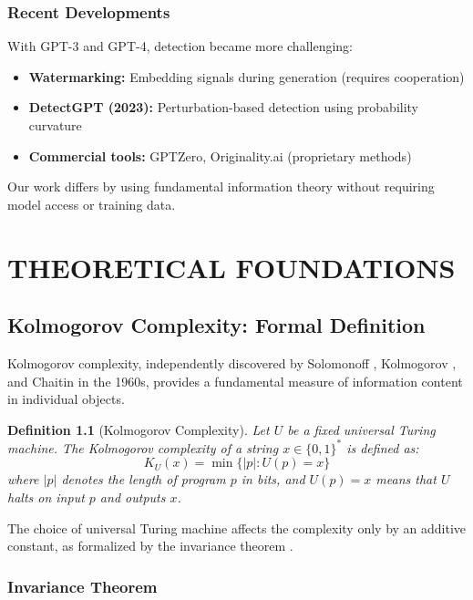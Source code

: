 \documentclass[12pt,a4paper]{report}
\newtheorem{definition}[theorem]{Definition}
\begin{document}
\subsection{Recent Developments}

With GPT-3 and GPT-4, detection became more challenging:

\begin{itemize}
    \item \textbf{Watermarking:} Embedding signals during generation (requires cooperation)
    \item \textbf{DetectGPT (2023):} Perturbation-based detection using probability curvature
    \item \textbf{Commercial tools:} GPTZero, Originality.ai (proprietary methods)
\end{itemize}

Our work differs by using fundamental information theory without requiring model access or training data.

\chapter{THEORETICAL FOUNDATIONS}

\section{Kolmogorov Complexity: Formal Definition}

Kolmogorov complexity, independently discovered by Solomonoff \cite{solomonoff1964formal}, Kolmogorov \cite{kolmogorov1965three}, and Chaitin \cite{chaitin1966length} in the 1960s, provides a fundamental measure of information content in individual objects.

\begin{definition}[Kolmogorov Complexity]
Let $U$ be a fixed universal Turing machine. The Kolmogorov complexity of a string $x \in \{0,1\}^*$ is defined as:
\begin{equation}
K_U(x) = \min\{|p| : U(p) = x\}
\end{equation}
where $|p|$ denotes the length of program $p$ in bits, and $U(p) = x$ means that $U$ halts on input $p$ and outputs $x$.
\end{definition}

The choice of universal Turing machine affects the complexity only by an additive constant, as formalized by the invariance theorem \cite{li2008introduction}.

\subsection{Invariance Theorem}
\end{document}
